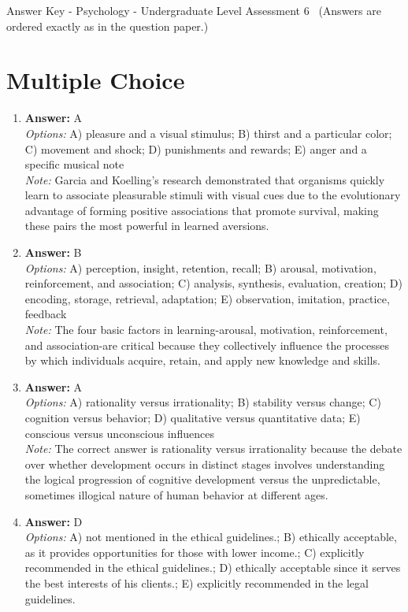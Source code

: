\documentclass[12pt]{article}
\begin{document}
\begin{center}
Answer Key - Psychology - Undergraduate Level Assessment 6 \
\small (Answers are ordered exactly as in the question paper.)
\end{center}

\section*{Multiple Choice}
\begin{enumerate}[label=\arabic*.]
\item \textbf{Answer:} A
\\ \textit{Options:} A) pleasure and a visual stimulus; B) thirst and a particular color; C) movement and shock; D) punishments and rewards; E) anger and a specific musical note
\\ \textit{Note:} Garcia and Koelling's research demonstrated that organisms quickly learn to associate pleasurable stimuli with visual cues due to the evolutionary advantage of forming positive associations that promote survival, making these pairs the most powerful in learned aversions.
\item \textbf{Answer:} B
\\ \textit{Options:} A) perception, insight, retention, recall; B) arousal, motivation, reinforcement, and association; C) analysis, synthesis, evaluation, creation; D) encoding, storage, retrieval, adaptation; E) observation, imitation, practice, feedback
\\ \textit{Note:} The four basic factors in learning-arousal, motivation, reinforcement, and association-are critical because they collectively influence the processes by which individuals acquire, retain, and apply new knowledge and skills.
\item \textbf{Answer:} A
\\ \textit{Options:} A) rationality versus irrationality; B) stability versus change; C) cognition versus behavior; D) qualitative versus quantitative data; E) conscious versus unconscious influences
\\ \textit{Note:} The correct answer is rationality versus irrationality because the debate over whether development occurs in distinct stages involves understanding the logical progression of cognitive development versus the unpredictable, sometimes illogical nature of human behavior at different ages.
\item \textbf{Answer:} D
\\ \textit{Options:} A) not mentioned in the ethical guidelines.; B) ethically acceptable, as it provides opportunities for those with lower income.; C) explicitly recommended in the ethical guidelines.; D) ethically acceptable since it serves the best interests of his clients.; E) explicitly recommended in the legal guidelines.

\end{enumerate}
\end{document}
